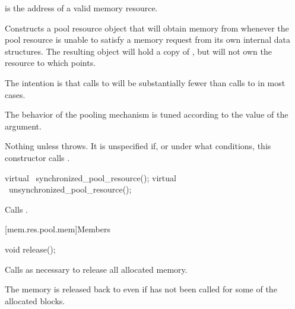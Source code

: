 \begin{itemdescr}
\pnum
\expects
{} is the address of a valid memory resource.

\pnum
\effects
Constructs a pool resource object that will obtain memory from 
whenever the pool resource is unable to satisfy a memory request
from its own internal data structures.
The resulting object will hold a copy of ,
but will not own the resource to which  points.
\begin{note}
The intention is that calls to 
will be substantially fewer than calls to 
in most cases.
\end{note}
The behavior of the pooling mechanism is tuned
according to the value of the  argument.

\pnum
\throws
Nothing unless  throws.
It is unspecified if, or under what conditions,
this constructor calls .
\end{itemdescr}

%
%
\begin{itemdecl}
virtual ~synchronized_pool_resource();
virtual ~unsynchronized_pool_resource();
\end{itemdecl}

\begin{itemdescr}
\pnum
\effects
Calls .
\end{itemdescr}

[mem.res.pool.mem]{Members}

\begin{indexed}{}
\begin{itemdecl}
void release();
\end{itemdecl}
\end{indexed}

\begin{itemdescr}
\pnum
\effects
Calls  as necessary
to release all allocated memory.
\begin{note}
The memory is released back to 
even if  has not been called
for some of the allocated blocks.
\end{note}
\end{itemdescr}

